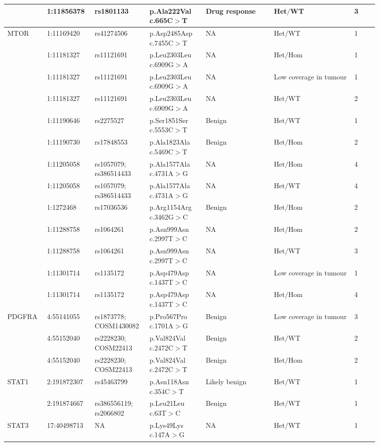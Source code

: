 \begin{landscape}
\begin{longtable}{p{0.09\linewidth}|p{0.1\linewidth}p{0.12\linewidth}p{0.14\linewidth}p{0.17\linewidth}p{0.2\linewidth}p{0.06\linewidth}}
		\\
		& 1:11856378 & rs1801133 & p.Ala222Val c.665C$>$T & Drug response & Het$/$WT & 3
		\\
		\hline
		MTOR & 1:11169420 & rs41274506 & p.Asp2485Asp c.7455C$>$T & NA & Het$/$WT & 1
		\\
		& 1:11181327 & rs11121691 & p.Leu2303Leu c.6909G$>$A & NA & Het$/$Hom & 1
		\\
		& 1:11181327 & rs11121691 & p.Leu2303Leu c.6909G$>$A & NA & Low coverage in tumour & 1
		\\
		& 1:11181327 & rs11121691 & p.Leu2303Leu c.6909G$>$A & NA & Het$/$WT & 2
		\\
		& 1:11190646 & rs2275527 & p.Ser1851Ser c.5553C$>$T & Benign & Het$/$WT & 1
		\\
		& 1:11190730 & rs17848553 & p.Ala1823Ala c.5469C$>$T & Benign & Het$/$Hom & 2
		\\
		& 1:11205058 & rs1057079; rs386514433 & p.Ala1577Ala c.4731A$>$G & NA & Het$/$Hom & 4
		\\
		& 1:11205058 & rs1057079; rs386514433 & p.Ala1577Ala c.4731A$>$G & NA & Het$/$WT & 4
		\\
		& 1:1272468 & rs17036536 & p.Arg1154Arg c.3462G$>$C & Benign & Het$/$Hom & 2
		\\
		& 1:11288758 & rs1064261 & p.Asn999Asn c.2997T$>$C & NA & Het$/$Hom & 2
		\\
		& 1:11288758 & rs1064261 & p.Asn999Asn c.2997T$>$C & NA & Het$/$WT & 3
		\\
		& 1:11301714 & rs1135172 & p.Asp479Asp c.1437T$>$C & NA & Low coverage in tumour & 1
		\\
		& 1:11301714 & rs1135172 & p.Asp479Asp c.1437T$>$C & NA & Het$/$Hom & 4
		\\
		\hline
		PDGFRA & 4:55141055 & rs1873778; COSM1430082 & p.Pro567Pro c.1701A$>$G & Benign & Low coverage in tumour & 3
		\\
		& 4:55152040 & rs2228230; COSM22413 & p.Val824Val c.2472C$>$T & Benign & Het$/$WT & 2
		\\
		& 4:55152040 & rs2228230; COSM22413 & p.Val824Val c.2472C$>$T & Benign & Het$/$Hom & 2
		\\
		\hline
		STAT1 & 2:191872307 & rs45463799 & p.Asn118Asn c.354C$>$T & Likely benign & Het$/$WT & 1
		\\
		& 2:191874667 & rs386556119; rs2066802 & p.Leu21Leu c.63T$>$C & Benign & Het$/$WT & 1
		\\
		\hline
		STAT3 & 17:40498713 & NA & p.Lys49Lys c.147A$>$G & NA & Het$/$WT & 1
		\\

\end{longtable}
\end{landscape}
